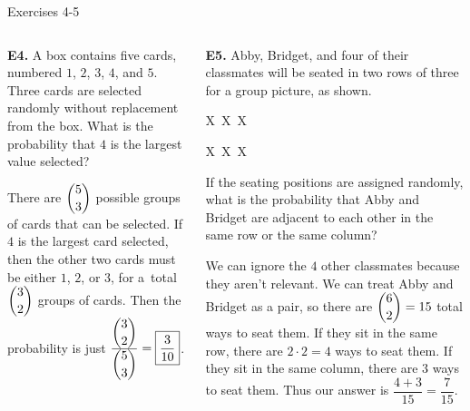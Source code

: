 \documentclass[9pt,aspectratio=169,handout]{beamer}
\begin{document}
\begin{frame}{Exercises 4-5}
  \begin{columns}[T]
    \begin{column}{0.5\textwidth}
      \begin{problem}
        \textbf{E4.} A box contains five cards, numbered $1$, $2$, $3$, $4$, and $5$. Three cards are selected randomly without replacement from the box. What is the probability that $4$ is the largest value selected?
      \end{problem}\pause
      There are $\dbinom{5}{3}$ possible groups of cards that can be selected. If $4$ is the largest card selected, then the other two cards must be either $1$, $2$, or $3$, for a~total $\dbinom{3}{2}$ groups of cards. Then the probability is just ${\frac{{\dbinom{3}{2}}}{{\dbinom{5}{3}}}} = \boxed{\frac{3}{10}}$.\pause
    \end{column}
    \begin{column}{0.5\textwidth}
      \begin{problem}
        \textbf{E5.} Abby, Bridget, and four of their classmates will be seated in two rows of three for a group picture, as shown.
        \begin{center}
          \vspace*{-\baselineskip}
          \quad X\ X\ X
  
          \quad X\ X\ X  
        \end{center}
        If the seating positions are assigned randomly, what is the probability that Abby and Bridget are adjacent to each other in the same row or the same column?
      \end{problem}\pause
      We can ignore the $4$ other classmates because they aren't relevant. We can treat Abby and Bridget as a pair, so there are $\dbinom{6}{2}=15$ total ways to seat them. If they sit in the same row, there are $2\cdot2=4$ ways to seat them. If they sit in the same column, there are $3$ ways to seat them. Thus our answer is $\dfrac{4+3}{15} = \boxed{\dfrac{7}{15}}$.
    \end{column}
  \end{columns}
\end{frame}
\end{document}
